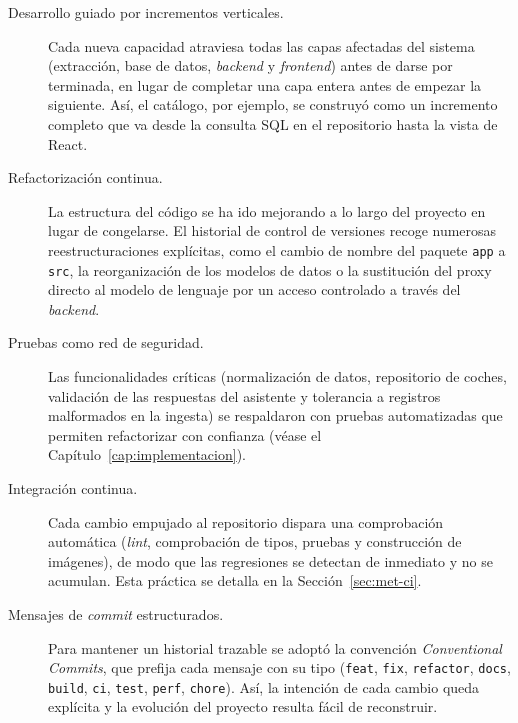 \begin{description}
  \item[Desarrollo guiado por incrementos verticales.] Cada nueva capacidad
        atraviesa todas las capas afectadas del sistema (extracción, base de
        datos, \emph{backend} y \emph{frontend}) antes de darse por terminada, en
        lugar de completar una capa entera antes de empezar la siguiente. Así, el
        catálogo, por ejemplo, se construyó como un incremento completo que va
        desde la consulta SQL en el repositorio hasta la vista de React.

  \item[Refactorización continua.] La estructura del código se ha ido mejorando
        a lo largo del proyecto en lugar de congelarse. El historial de control
        de versiones recoge numerosas reestructuraciones explícitas, como el
        cambio de nombre del paquete \texttt{app} a \texttt{src}, la
        reorganización de los modelos de datos o la sustitución del proxy directo
        al modelo de lenguaje por un acceso controlado a través del
        \emph{backend}.

  \item[Pruebas como red de seguridad.] Las funcionalidades críticas
        (normalización de datos, repositorio de coches, validación de las
        respuestas del asistente y tolerancia a registros malformados en la
        ingesta) se respaldaron con pruebas automatizadas que permiten
        refactorizar con confianza (véase el Capítulo~\ref{cap:implementacion}).

  \item[Integración continua.] Cada cambio empujado al repositorio dispara una
        comprobación automática (\emph{lint}, comprobación de tipos, pruebas y
        construcción de imágenes), de modo que las regresiones se detectan de
        inmediato y no se acumulan. Esta práctica se detalla en la
        Sección~\ref{sec:met-ci}.

  \item[Mensajes de \emph{commit} estructurados.] Para mantener un historial
        trazable se adoptó la convención \emph{Conventional Commits}, que prefija
        cada mensaje con su tipo (\texttt{feat}, \texttt{fix}, \texttt{refactor},
        \texttt{docs}, \texttt{build}, \texttt{ci}, \texttt{test}, \texttt{perf},
        \texttt{chore}). Así, la intención de cada cambio queda explícita y la
        evolución del proyecto resulta fácil de reconstruir.
\end{description}

